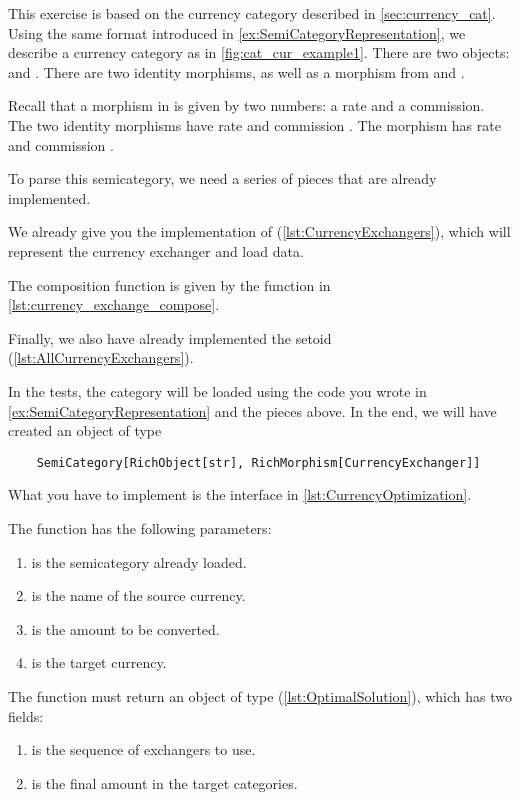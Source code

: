 



This exercise is based on the currency category described in \cref{sec:currency_cat}.
Using the same format introduced in \cref{ex:SemiCategoryRepresentation}, we describe a currency category as in \cref{fig:cat_cur_example1}. 
There are two objects:  and . There are two identity morphisms, as well as a morphism from  and .

Recall that a morphism in \Curr is given by two numbers: a rate and a commission. The two identity morphisms have rate  and commission .
The morphism  has rate  and commission .

To parse this semicategory, we need a series of pieces that are already implemented.

We already give you the implementation of  (\cref{lst:CurrencyExchangers}), which will represent the currency exchanger and load data.


The composition function is given by the function  in \cref{lst:currency_exchange_compose}.


Finally, we also have already implemented the setoid  (\cref{lst:AllCurrencyExchangers}).


In the tests, the category will be loaded using the code you wrote in \cref{ex:SemiCategoryRepresentation} and the pieces above.
In the end, we will have created an object of type
\begin{verbatim}
    SemiCategory[RichObject[str], RichMorphism[CurrencyExchanger]]
\end{verbatim}

What you have to implement is the interface in \cref{lst:CurrencyOptimization}.

The function  has the following parameters:
\begin{enumerate}
    \item {} is the semicategory already loaded.
    \item {} is the name of the source currency.
    \item {} is the amount to be converted.
    \item {} is the target currency.
\end{enumerate}
The function must return an object of type  (\cref{lst:OptimalSolution}), which has two fields:
\begin{enumerate}
    \item {} is the sequence of exchangers to use.
    \item {} is the final amount in the target categories.
\end{enumerate}

